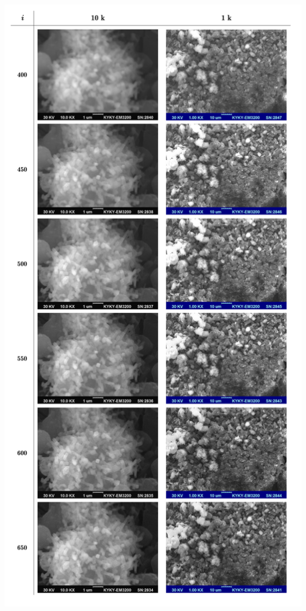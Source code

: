 \documentclass[aps,pre,12pt,preprint,%
	onecolumn,showpacs,showkeys,nofootinbib]{revtex4-1}
\begin{document}
\clearpage
\FloatBarrier\thispagestyle{empty}
	\begin{minipage}{\linewidth}
	\vspace{-3.85\baselineskip}\hspace{-7.5em}
	\begin{minipage}[c]{.6\linewidth}
	\includegraphics[width=\linewidth]{photoGrid.pdf}

\end{minipage}
\end{minipage}
\end{document}
